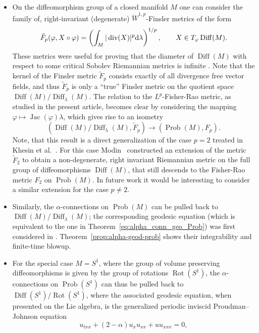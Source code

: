 \documentclass[11pt]{amsart}
\theoremstyle{definition}
\newcommand{\dx}{\lambda}
\newcommand{\Prob}{\operatorname{Prob}(M)}
\newcommand{\Diff}{\operatorname{Diff}(M)}
\newcommand{\SDiff}{\operatorname{Diff}_{\dx}(M)}
\newcommand{\ud}{\textup{d}}
\begin{document}
\begin{itemize}
\item On the diffeomorphism group of a closed manifold $M$ one can consider the family of, right-invariant (degenerate) $\dot W^{1,p}$-Finsler metrics of the form  
\begin{equation*}
\tilde F_p(\varphi,X\circ\varphi)=\left(\int_M |\operatorname{div}(X)|^p \ud\dx\right)^{1/p},\qquad X\in T_{\varphi}\Diff.
\end{equation*}
These metrics were useful for proving that the diameter of $\Diff$ with respect to some critical Sobolev Riemannian metrics is infinite \cite{bauer2021can}.
Note that the kernel of the Finsler metric $\tilde F_p$ consists exactly of all divergence free vector fields, and thus $\tilde F_p$ is only a  ``true'' Finsler metric on the quotient space $\Diff/\SDiff$. 
The relation to the $L^p$-Fisher-Rao metric, as studied in the present article, becomes clear by considering the mapping $\varphi\mapsto \operatorname{Jac}(\varphi)\lambda$, which gives rise to an isometry 
\begin{equation*}
 (\Diff/\SDiff,\tilde F_p)\to(\Prob,F_p).  
\end{equation*} Note, that this result is a direct generalization of the case $p=2$ treated in Khesin et al.~\cite{khesin2013geometry}. 
For this case Modin~\cite{modin2015generalized} constructed an extension of the metric $\tilde F_2$ to obtain a non-degenerate, right invariant Riemannian metric on the full group of diffeomorphisms $\Diff$, that still descends to the Fisher-Rao metric $F_2$ on $\Prob$. In future work it would be interesting to consider a similar extension for the case $p\neq 2$.
\item Similarly, the $\alpha$-connections on $\operatorname{Prob}(M)$ can be pulled back to $\Diff/\SDiff$; the corresponding geodesic equation (which is equivalent to the one in Theorem~\ref{eq:alpha_conn_geo_Prob}) was first considered in \cite{lenells2014amari}.
Theorem~\ref{prop:alpha-geod-prob} shows their integrability and finite-time blowup.
\item For the special case $M=S^1$, where the group of volume preserving diffeomorphisms is given by the group of rotations $\operatorname{Rot}(S^1)$, the $\alpha$-connections on $\operatorname{Prob}(S^1)$ can thus be pulled back to $\operatorname{Diff}(S^1)/\operatorname{Rot}(S^1)$, where the associated geodesic equation, when presented on the Lie algebra, is the generalized periodic inviscid Proudman--Johnson equation 
\[
u_{txx}+(2-\alpha)u_xu_{xx} + uu_{xxx} = 0,
\]
\end{itemize}
\end{document}
